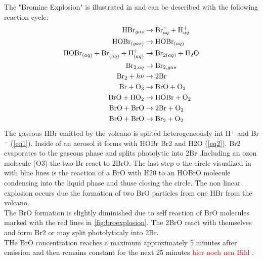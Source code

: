 \documentclass  [
  paper    = a4,
  BCOR     = 10mm,
  twoside,
  fontsize = 12pt,
  fleqn,
  toc      = bibnumbered,
  toc      = listofnumbered,
  numbers  = noendperiod,
  headings = normal,
  listof   = leveldown,
  version  = 3.03
]                                       {scrreprt}
\begin{document}
The "Bromine Explosion" is illustrated in  and can be described with the following reaction cycle:
\begin{align}
\ce{HBr}_{gas} &\rightarrow \ce{Br}^{-}_{aq} + \ce{H}^{+}_{aq} \label{eq1}\\
\ce{HOBr}_{(gas)} &\rightarrow \ce{HOBr}_{(aq)} \\
\ce{HOBr}_{(aq)} + \ce{Br}^{-}_{(aq)} + \ce{H}^{+}_{(aq)} &\rightarrow
\ce{Br}_{2(aq)} +  \ce{H2O}\label{eq2}\\
\ce{Br}_{2,aq} &\rightarrow \ce{Br}_{2,gas} \\
\ce{Br2} + h\nu &\rightarrow 2 \ce{Br} \\
\ce{Br} + \ce{O3} &\rightarrow \ce{BrO} + \ce{O2} \\
\ce{BrO} + \ce{HO2} &\rightarrow \ce{HOBr} + \ce{O2} \\
\ce{BrO} + \ce{BrO} &\rightarrow 2 \ce{Br} + \ce{O2} \\
\ce{BrO} + \ce{BrO} &\rightarrow \ce{Br2} + \ce{O2}
\end{align}
The gaseous HBr emitted by the volcano is splited heterogeneously int H$^{+}$ and Br$^{-}$ (\cref{eq1}). Inside of an aerosol it forms with HOBr Br2 and H2O (\cref{eq2}). Br2 evaporates to the gaseous phase and splits photolytic  into 2Br .Including an ozon molecule (O3) the two Br react to 2BrO. The last step o the circle visualized in  with blue lines is the reaction of a BrO with H20 to an HOBrO molecule condensing into the liquid phase  and thuse closing the circle. The non linear explosion occurs due the formation of two BrO particles from one HBr from the volcano.\\
The BrO formation is slightly diminished due to self reaction of BrO molecules marked with the red lines in \cref{fig:broexplosion}. The 2BrO react with themselves and form Br2 or may split photolyticaly into 2Br.\\
THe BrO concentration reaches a maximum approximately 5 minutes after emission and then remains constant for the next 25 minutes \textcolor{red}{hier noch nen Bild} \citet{lubcke2014bro}.
 
\end{document}

